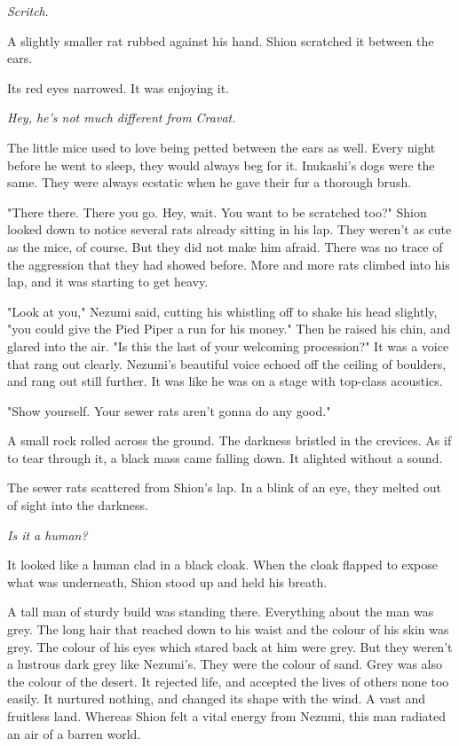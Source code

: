 \emph{Scritch}.

A slightly smaller rat rubbed against his hand. Shion scratched it
between the ears.

Its red eyes narrowed. It was enjoying it.

\emph{Hey, he's not much different from Cravat.}

The little mice used to love being petted between the ears as well.
Every night before he went to sleep, they would always beg for it.
Inukashi's dogs were the same. They were always ecstatic when he gave
their fur a thorough brush.

"There there. There you go. Hey, wait. You want to be scratched too?"
Shion looked down to notice several rats already sitting in his lap.
They weren't as cute as the mice, of course. But they did not make him
afraid. There was no trace of the aggression that they had showed
before. More and more rats climbed into his lap, and it was starting to
get heavy.

"Look at you," Nezumi said, cutting his whistling off to shake his head
slightly, "you could give the Pied Piper a run for his money." Then he
raised his chin, and glared into the air. "Is this the last of your
welcoming procession?" It was a voice that rang out clearly. Nezumi's
beautiful voice echoed off the ceiling of boulders, and rang out still
further. It was like he was on a stage with top-class acoustics.

"Show yourself. Your sewer rats aren't gonna do any good."

A small rock rolled across the ground. The darkness bristled in the
crevices. As if to tear through it, a black mass came falling down. It
alighted without a sound.

The sewer rats scattered from Shion's lap. In a blink of an eye, they
melted out of sight into the darkness.

\emph{Is it a human\el ?}

It looked like a human clad in a black cloak. When the cloak flapped to
expose what was underneath, Shion stood up and held his breath.

A tall man of sturdy build was standing there. Everything about the man
was grey. The long hair that reached down to his waist and the colour of
his skin was grey. The colour of his eyes which stared back at him were
grey. But they weren't a lustrous dark grey like Nezumi's. They were the
colour of sand. Grey was also the colour of the desert. It rejected
life, and accepted the lives of others none too easily. It nurtured
nothing, and changed its shape with the wind. A vast and fruitless land.
Whereas Shion felt a vital energy from Nezumi, this man radiated an air
of a barren world.

